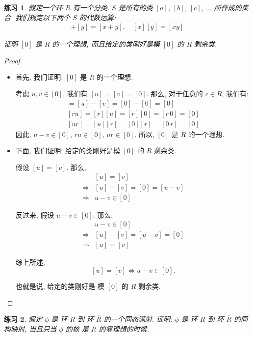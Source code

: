 \documentclass[utf8]{ctexbook}
\newtheorem{exercise}{练习}[section]
\begin{document}
\begin{exercise}
假定一个环 $R$ 有一个分类. $S$ 是所有的类 $[a]$, $[b]$, $[c]$, $\ldots$ 所作成的集合. 我们规定以下两个 $S$ 的代数运算:
\begin{align*}
[x] +[y] =[x+y], \quad [x][y] = [xy]
\end{align*}

证明 $[0]$ 是 $R$ 的一个理想, 而且给定的类刚好是模 $[0]$ 的 $R$ 剩余类.
\end{exercise}

\begin{proof}
\begin{itemize}
\item{首先, 我们证明: $[0]$ 是 $R$ 的一个理想.

考虑 $u, v \in [0]$, 我们有 $[u] =[v] =[0]$. 那么, 对于任意的 $r \in R$, 我们有:
\begin{align*}
[u-v] = [u] -[v] = [0] - [0] = [0] \\
[ru] = [r] [u] = [r] [0] = [r \, 0] = [0] \\
[u r] = [u][r] = [0] [r] = [0 \, r] =  [0]
\end{align*}
因此, $u - v \in [0]$, $r u \in [0]$, $u r \in [0]$. 所以, $[0]$ 是 $R$ 的一个理想.
}
\item{下面, 我们证明: 给定的类刚好是模 $[0]$ 的 $R$ 剩余类.

假设 $[u] =[v]$. 那么, 
\begin{align*}
& [u] = [v] \\
\Longrightarrow  & [u] - [v] = [0] = [u-v] \\
\Longrightarrow& u - v \in [0] 
\end{align*}

反过来, 假设 $u - v \in [0]$. 那么,
\begin{align*}
& u - v \in [0] \\
\Longrightarrow & [u] - [v] = [u-v] = [0] \\
\Longrightarrow & [u] = [v]
\end{align*}

综上所述, 
$$[u] = [v] \iff u - v \in [0]. $$

也就是说, 给定的类刚好是 模 $[0]$ 的 $R$ 剩余类.
}
\end{itemize}

\end{proof}

\begin{exercise}
假定 $\phi$ 是 环 $R$ 到 环 $\overline{R}$ 的一个同态满射. 证明: $\phi$ 是 环 $R$ 到 环 $\overline{R}$ 的同构映射, 当且只当 $\phi$ 的核 是 $R$ 的零理想的时候.
\end{exercise}
\end{document}
